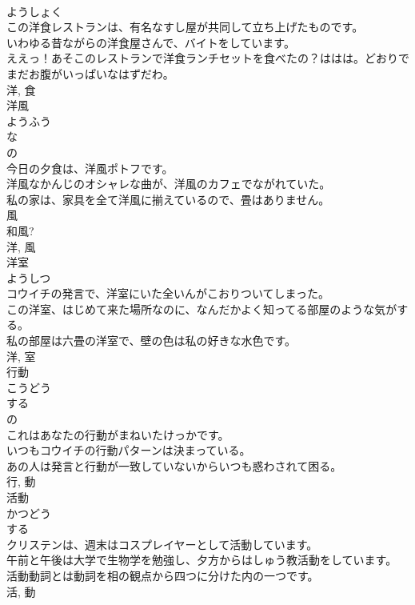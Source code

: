\documentclass[8pt]{extreport}
\begin{document}
\begin{CJK}{UTF8}{min}
\\	ようしょく	
\\	この洋食レストランは、有名なすし屋が共同して立ち上げたものです。	
\\	いわゆる昔ながらの洋食屋さんで、バイトをしています。	
\\	ええっ！あそこのレストランで洋食ランチセットを食べたの？ははは。どおりでまだお腹がいっぱいなはずだわ。	
\\	洋, 食	
\\	洋風	
\\	ようふう	
\\	な 
\\	の 
\\	今日の夕食は、洋風ポトフです。	
\\	洋風なかんじのオシャレな曲が、洋風のカフェでながれていた。	
\\	私の家は、家具を全て洋風に揃えているので、畳はありません。	
\\	風 
\\	和風? 
\\	洋, 風	
\\	洋室	
\\	ようしつ	
\\	コウイチの発言で、洋室にいた全いんがこおりついてしまった。	
\\	この洋室、はじめて来た場所なのに、なんだかよく知ってる部屋のような気がする。	
\\	私の部屋は六畳の洋室で、壁の色は私の好きな水色です。	
\\	洋, 室	
\\	行動	
\\	こうどう	
\\	する 
\\	の 
\\	これはあなたの行動がまねいたけっかです。	
\\	いつもコウイチの行動パターンは決まっている。	
\\	あの人は発言と行動が一致していないからいつも惑わされて困る。	
\\	行, 動	
\\	活動	
\\	かつどう	
\\	する 
\\	クリステンは、週末はコスプレイヤーとして活動しています。	
\\	午前と午後は大学で生物学を勉強し、夕方からはしゅう教活動をしています。	
\\	活動動詞とは動詞を相の観点から四つに分けた内の一つです。	
\\	活, 動	

\end{CJK}
\end{document}
